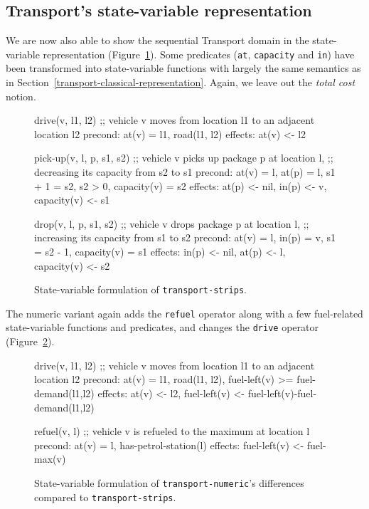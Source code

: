 \subsection{Transport's state-variable representation}

We are now also able to show the sequential Transport domain
in the state-variable representation (Figure~\ref{code:statevar-strips}).
Some predicates (\verb+at+, \verb+capacity+ and \verb+in+) have been transformed
into state-variable functions with largely the same semantics as in
Section~\ref{transport-classical-representation}. Again, we leave out
the \textit{total cost} notion.

\begin{figure}[tbp]
\begin{code}
drive(v, l1, l2)
  ;; vehicle v moves from location l1 to an adjacent location l2
  precond: at(v) = l1, road(l1, l2)
  effects: at(v) <- l2

pick-up(v, l, p, s1, s2)
  ;; vehicle v picks up package p at location l,
  ;; decreasing its capacity from s2 to s1
  precond: at(v) = l, at(p) = l, s1 + 1 = s2, s2 > 0, capacity(v) = s2
  effects: at(p) <- nil, in(p) <- v, capacity(v) <- s1
  
drop(v, l, p, s1, s2)
  ;; vehicle v drops package p at location l,
  ;; increasing its capacity from s1 to s2
  precond: at(v) = l, in(p) = v, s1 = s2 - 1, capacity(v) = s1
  effects: in(p) <- nil, at(p) <- l, capacity(v) <- s2
\end{code}
\caption{State-variable formulation of \texttt{transport-strips}.}
\label{code:statevar-strips}
\end{figure}

The numeric variant again adds the \verb+refuel+ operator along with
a few fuel-related state-variable functions and predicates, and changes 
the \verb+drive+ operator (Figure~\ref{code:statevar-numeric}).

\begin{figure}[tb]
\begin{code}
drive(v, l1, l2)
  ;; vehicle v moves from location l1 to an adjacent location l2
  precond: at(v) = l1, road(l1, l2), fuel-left(v) >= fuel-demand(l1,l2)
  effects: at(v) <- l2, fuel-left(v) <- fuel-left(v)-fuel-demand(l1,l2)
  
refuel(v, l)
  ;; vehicle v is refueled to the maximum at location l
  precond: at(v) = l, has-petrol-station(l)
  effects: fuel-left(v) <- fuel-max(v)
\end{code}
\caption[Partial state-variable formulation of \texttt{transport-numeric}.]{State-variable formulation of \texttt{transport-numeric}'s differences
compared to \texttt{transport-strips}.}
\label{code:statevar-numeric}
\end{figure}

